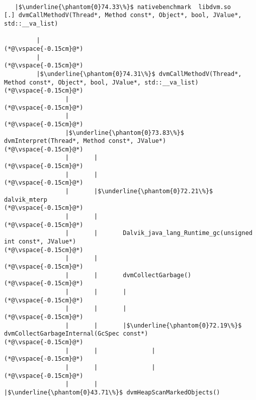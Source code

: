 
\begin{lstlisting}

   |$\underline{\phantom{0}74.33\%}$ nativebenchmark  libdvm.so           [.] dvmCallMethodV(Thread*, Method const*, Object*, bool, JValue*, std::__va_list)

         |
(*@\vspace{-0.15cm}@*)
         |
(*@\vspace{-0.15cm}@*)
         |$\underline{\phantom{0}74.31\%}$ dvmCallMethodV(Thread*, Method const*, Object*, bool, JValue*, std::__va_list)
(*@\vspace{-0.15cm}@*)
                 |
(*@\vspace{-0.15cm}@*)
                 |
(*@\vspace{-0.15cm}@*)
                 |$\underline{\phantom{0}73.83\%}$ dvmInterpret(Thread*, Method const*, JValue*)
(*@\vspace{-0.15cm}@*)
                 |       |
(*@\vspace{-0.15cm}@*)
                 |       |
(*@\vspace{-0.15cm}@*)
                 |       |$\underline{\phantom{0}72.21\%}$ dalvik_mterp
(*@\vspace{-0.15cm}@*)
                 |       |
(*@\vspace{-0.15cm}@*)
                 |       |       Dalvik_java_lang_Runtime_gc(unsigned int const*, JValue*)
(*@\vspace{-0.15cm}@*)
                 |       |
(*@\vspace{-0.15cm}@*)
                 |       |       dvmCollectGarbage()
(*@\vspace{-0.15cm}@*)
                 |       |       |
(*@\vspace{-0.15cm}@*)
                 |       |       |
(*@\vspace{-0.15cm}@*)
                 |       |       |$\underline{\phantom{0}72.19\%}$ dvmCollectGarbageInternal(GcSpec const*)
(*@\vspace{-0.15cm}@*)
                 |       |               |
(*@\vspace{-0.15cm}@*)
                 |       |               |
(*@\vspace{-0.15cm}@*)
                 |       |               |$\underline{\phantom{0}43.71\%}$ dvmHeapScanMarkedObjects()

\end{lstlisting}
